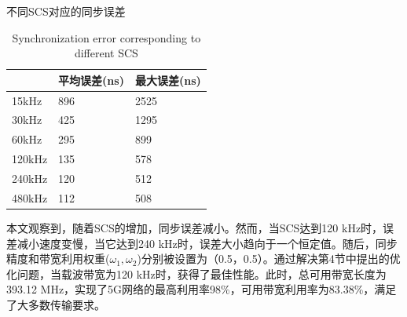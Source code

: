 \documentclass[UTF8,a4paper,12pt]{ctexart}
\numberwithin{equation}{section}
\begin{document}
\begin{table}[!htb]
	\centering
	\caption{不同SCS对应的同步误差}
	\vspace{-10pt}
	\caption{Synchronization error corresponding to different SCS}
	\label{tab1}
	\begin{tabular}{l|l|l}
		\hline
		& \textbf{平均误差(ns)}& \textbf{最大误差(ns)} \\
		\hline
		15kHz 
		& 896
		& 2525 \\
		\hline
		30kHz
		& 425
		& 1295 \\
		\hline
		60kHz
		& 295
		& 899 \\
		\hline
		120kHz
		& 135
		& 578 \\
		\hline
		240kHz
		& 120
		& 512 \\
		\hline
		480kHz
		& 112
		& 508 \\
		\hline
	\end{tabular}
\end{table}


本文观察到，随着SCS的增加，同步误差减小。然而，当SCS达到120 kHz时，误差减小速度变慢，当它达到240 kHz时，误差大小趋向于一个恒定值。随后，同步精度和带宽利用权重($\omega_1,\omega_2$)分别被设置为（0.5，0.5）。通过解决第4节中提出的优化问题，当载波带宽为120 kHz时，获得了最佳性能。此时，总可用带宽长度为393.12 MHz，实现了5G网络的最高利用率98\%，可用带宽利用率为83.38\%，满足了大多数传输要求。
\end{document}
